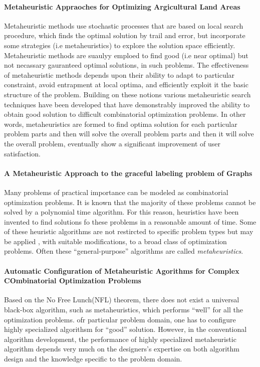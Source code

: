 \paragraph{Metaheuristic Appraoches for Optimizing Argicultural Land Areas}
Metaheuristic methods use stochastic processes that are based on local search procedure, which finds the optimal solution by trail and error, but incorporate some strategies (i.e metaheuristics) to explore the solution space efficiently. Metaheuristic methods are suaulyy emploed to find good (i.e near optimal) but not necassary gauranteed optimal solutions, in such problems. The effectiveness of metaheuristic methods depends upon their ability to adapt to particular constraint, avoid entrapment at local optima, and efficiently exploit it the basic structure of the problem. Building on these notions various metaheuristic search techniques have been developed that have demonstrably improved the ability to obtain good solution to difficult combinatorial optimization problems. In other words, metaheuristics are formed to find optima solution for each particular problem parts and then will solve the overall problem parts and then it will solve the overall problem, eventually show a significant improvement of user satisfaction.

\paragraph{A Metaheuristic Approach to the graceful labeling problem of Graphs}
Many problems of practical importance can be modeled as combinatorial optimization problems. It is known that the majority of these problems cannot be solved by a polynomial time algorithm. For this reason, heuristics have been invented to find solutions fo these problems in a reasonable amount of time. Some of these heuristic algorithms are not restircted to specific problem types but may be applied , with suitable modifications, to a broad class of optimization problems. Often these ``general-purpose'' algorithms are called \emph{metaheuristics}.

\paragraph{Automatic Configuration of Metaheuristic Agorithms for Complex COmbinatorial Optimization Problems}
Based on the No Free Lunch(NFL) theorem, there does not exist a universal black-box algorithm, such as metaheuristics, which performs ``well'' for all the optimization problems. ofr particular problem domain, one has to configure highly specialized algorithsm for ``good'' solution. However, in the conventional algorithm development, the performance of highly specialized metaheuristic algorithm depends very much on the designers's expertise on both algorithm design and the knowledge specific to the problem domain.

